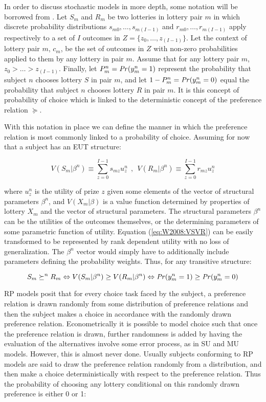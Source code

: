 \documentclass[../main.tex]{subfiles}
\begin{document}
In order to discuss stochastic models in more depth, some notation will be borrowed from \textcite{Wilcox2008}.
Let $S_m$ and $R_m$ be two lotteries in lottery pair $m$ in which discrete probability distributions $s_{m0} , \ldots , s_{m(I-1)}$ and $r_{m0} , \ldots , r_{m(I-1)}$ apply respectively to a set of $I$ outcomes in $Z = \lbrace z_0 , \ldots , z_{(I-1)} \rbrace$.
Let the context of lottery pair $m$, $c_m$, be the set of outcomes in $Z$ with non-zero probabilities applied to them by any lottery in pair $m$.
Assume that for any lottery pair $m$, $z_0 > \ldots > z_{(I-1)}$.
Finally, let $P_m^n = {\mathit{Pr}}(y_m^n = 1) $ represent the probability that subject $n$ chooses lottery $S$ in pair $m$, and let $1-P_m^n = {\mathit{Pr}}(y_m^n = 0)$ equal the probability that subject $n$ chooses lottery $R$ in pair $m$.
It is this concept of probability of choice which is linked to the deterministic concept of the preference relation $\succeq$.

With this notation in place we can define the manner in which the preference relation  is most commonly linked to a probability of choice.
Assuming for now that a subject has an EUT structure: 

\begin{equation}
	\label{eq:W2008:VSVR}
	V( S_m | \beta^n )  \equiv \sum_{z=0}^{I-1} s_{mz} u^n_z   ~~,~~  V( R_m | \beta^n ) \equiv \sum_{z=0}^{I-1} r_{mz} u^n_z
\end{equation}

\noindent where $u_z^n$ is the utility of prize $z$ given some elements of the vector of structural parameters $\beta^n$, and $V(X_m|\beta)$ is a value function determined by properties of lottery $X_m$ and the vector of structural parameters.
The structural parameters $\beta^n$ can be the utilities of the outcomes themselves, or the determining parameters of some parametric function of utility.
Equation (\ref{eq:W2008:VSVR}) can be easily transformed to be represented by rank dependent utility with no loss of generalization.
The $\beta^n$ vector would simply have to additionally include parameters defining the probability weights.
Thus, for any transitive structure:

\begin{equation}
	S_m \succeq^n R_m \Leftrightarrow  V( S_m | \beta^n ) \geq V( R_m | \beta^n ) \Leftrightarrow {\ensuremath{\mathit{Pr}}}( y^n_m=1 ) \geq {\ensuremath{\mathit{Pr}}}( y^n_m=0 )
\end{equation}

RP models posit that for every choice task faced by the subject, a preference relation is drawn randomly from some distribution of preference relations and then the subject makes a choice in accordance with the randomly drawn preference relation.
Econometrically it is possible to model choice such that once the preference relation is drawn, further randomness is added by having the evaluation of the alternatives involve some error process, as in SU and MU models.
However, this is almost never done.
Usually subjects conforming to RP models are said to draw the preference relation randomly from a distribution, and then make a choice deterministically with respect to the preference relation.
Thus the probability of choosing any lottery conditional on this randomly drawn preference is either 0 or 1:
\end{document}
